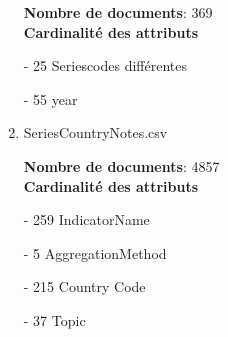\begin{enumerate}
\textbf{Nombre de documents}: 369 \\
\textbf{Cardinalité des attributs}

     - 25 Seriescodes différentes
     
     - 55 year

\vspace{2mm}
    \item SeriesCountryNotes.csv
\vspace{2mm}

\textbf{Nombre de documents}: 4857 \\
\textbf{Cardinalité des attributs}

     - 259 IndicatorName

     - 5 AggregationMethod

     - 215 Country Code

     - 37 Topic

\end{enumerate}

